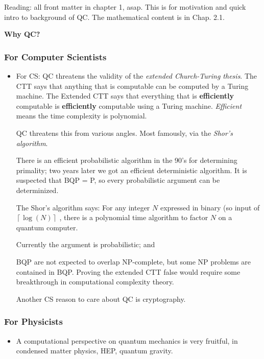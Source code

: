 
Reading: all front matter in chapter 1, asap. This is for motivation and quick intro to background of QC. The mathematical content is in Chap. 2.1.

\textbf{Why QC?}

\subsubsection{For Computer Scientists}


\begin{itemize}
	\item For CS: QC threatens the validity of the \textit{extended Church-Turing thesis}.
		The CTT says that anything that is computable can be computed by a Turing machine.
		The Extended CTT says that everything that is \textbf{efficiently} computable is \textbf{efficiently} computable using a Turing machine. \textit{Efficient} means the time complexity is polynomial.
	
		QC threatens this from various angles. Most famously, via the \textit{Shor's algorithm}.

		There is an efficient probabilistic algorithm in the 90's for determining primality; two years later we got an efficient deterministic algorithm. It is suspected that BQP = P, so every probabilistic argument can be determinized. 

	The Shor's algorithm says: For any integer $N$ expressed in binary (so input of $\left\lceil \log\left( N \right)  \right\rceil $ , there is a polynomial time algorithm to factor $N$ on a quantum computer.

	Currently the argument is probabilistic; and 

	BQP are not expected to overlap NP-complete, but some NP problems are contained in BQP. Proving the extended CTT false would require some breakthrough in computational complexity theory.

	Another CS reason to care about QC is cryptography.


\end{itemize}

\subsubsection{For Physicists}

\begin{itemize}
	\item A computational perspective on quantum mechanics is very fruitful, in condensed matter physics, HEP, quantum gravity.
\end{itemize}


